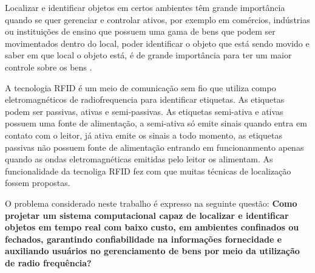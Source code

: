 \par
\begin{comment}
Os edifícios e construções dificultam o envio de sinais de rádio emitidos pelos satélites e dispositivos que fazem uso do GPS, 
por essa questão sua utilização torna-se inviável para aplicações que consistem em localizar objetos em ambientes fechados, 
além que o tempo-de-luz transitório fica difícil e caro para fazer sua medição \cite{rfid2009review}.
\end{comment}


Localizar e identificar objetos em certos ambientes têm grande importância quando se quer gerenciar e controlar ativos, 
por exemplo em comércios, indústrias ou instituições de ensino que possuem uma gama de bens que podem ser movimentados dentro do local, 
poder identificar o objeto que está sendo movido e saber em que local o objeto está, é de grande importância para ter um maior 
controle sobre os bens \cite{realtimeRFID2016}. 

A tecnologia RFID é um meio de comunicação sem fio que utiliza compo eletromagnéticos de 
radiofrequencia para identificar etiquetas. As etiquetas podem ser passivas, ativas e 
semi-passivas. As etiquetas semi-ativa e ativas possuem uma fonte de alimentação, a semi-ativa só emite sinais 
quando entra em contato com o leitor, já ativa emite os sinais a todo momento, as etiquetas passivas não 
possuem fonte de alimentação entrando em funcionanmento apenas quando as ondas eletromagnéticas emitidas pelo 
leitor os alimentam\cite{realtimeRFID2016}. As funcionalidade da tecnoliga RFID fez com que muitas técnicas de localização fossem propostas.

\begin{comment}
\par
Muitas técnicas de localização baseadas em RFID foram propostas, sendo com foco em objetos móveis ou estacionários, contudo algumas dessas 
técnicas fazem uso de etiquetas ativas a fim de obter melhores estimativas,
\end{comment}


O problema considerado neste trabalho é expresso na seguinte questão: 
\textbf{Como projetar um sistema computacional capaz de localizar e identificar objetos em tempo real com baixo custo, em ambientes confinados ou fechados, garantindo confiabilidade na informações fornecidade e auxiliando usuários no gerenciamento de bens por meio da utilização de radio frequência?}

